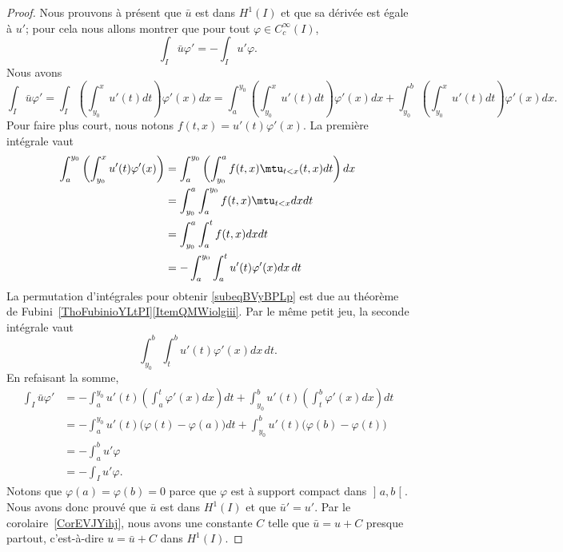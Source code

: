 \begin{proof}
	Nous prouvons à présent que \( \bar u\) est dans \( H^1(I)\) et que sa dérivée est égale à \( u'\); pour cela nous allons montrer que pour tout \( \varphi\in  C^{\infty}_c(I)\),
	\begin{equation}
		\int_I\bar u\varphi'=-\int_Iu'\varphi.
	\end{equation}
	Nous avons
	\begin{equation}
		\int_I\bar u\varphi'=\int_I\left( \int_{y_0}^xu'(t)dt\right)\varphi'(x)dx
		=\int_{a}^{y_0}\left( \int_{y_0}^xu'(t)dt\right)\varphi'(x)dx+\int_{y_0}^b\left( \int_{y_0}^xu'(t)dt\right)\varphi'(x)dx.
	\end{equation}
	Pour faire plus court, nous notons \( f(t,x)=u'(t)\varphi'(x)\). La première intégrale vaut
	\begin{subequations}
		\begin{align}
			\int_a^{y_0}\left( \int_{y_0}^x u'(t)\varphi'(x) \right) & =\int_a^{y_0}\left(\int_{y_0}^af(t,x)\mtu_{t<x}(t,x)dt\right)dx     \\
			                                                         & =\int_{y_0}^a\int_a^{y_0}f(t,x)\mtu_{t<x}dxdt  \label{subeqBVyBPLp} \\
			                                                         & =\int_{y_0}^a\int_a^tf(t,x)dxdt                                     \\
			                                                         & =-\int_a^{y_0}\int_a^tu'(t)\varphi'(x)dx\,dt
		\end{align}
	\end{subequations}
	La permutation d'intégrales pour obtenir \eqref{subeqBVyBPLp} est due au théorème de Fubini~\ref{ThoFubinioYLtPI}\ref{ItemQMWiolgiii}. Par le même petit jeu, la seconde intégrale vaut
	\begin{equation}
		\int_{y_0}^b\int_t^b u'(t)\varphi'(x)dx\,dt.
	\end{equation}
	En refaisant la somme,
	\begin{subequations}
		\begin{align}
			\int_I\bar u\varphi'
			 & =-\int_a^{y_0}u'(t)\left( \int_a^t\varphi'(x)dx \right)dt+\int_{y_0}^bu'(t)\left( \int_t^b\varphi'(x)dx \right)dt \\
			 & =-\int_a^{y_0}u'(t)\big( \varphi(t)-\varphi(a) \big)dt+\int_{y_0}^bu'(t)\big( \varphi(b)-\varphi(t) \big)         \\
			 & =-\int_a^bu'\varphi                                                                                               \\
			 & =-\int_Iu'\varphi.
		\end{align}
	\end{subequations}
	Notons que \( \varphi(a)=\varphi(b)=0\) parce que \( \varphi\) est à support compact dans \( \mathopen] a , b \mathclose[\). Nous avons donc prouvé que \( \bar u\) est dans \( H^1(I)\) et que \( \bar u'=u'\). Par le corolaire~\ref{CorEVJYihj}, nous avons une constante \( C\) telle que \( \bar u=u+C\) presque partout, c'est-à-dire \( u=\bar u +C\) dans \( H^1(I)\).


\end{proof}
